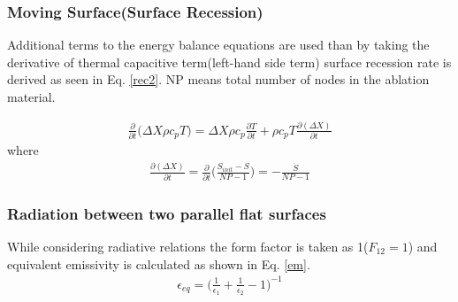 \documentclass[a4paper, 12pt]{article} %
\begin{document}
\subsubsection{Moving Surface(Surface Recession)}
Additional terms to the energy balance equations are used than by taking the derivative of thermal capacitive term(left-hand side term) surface recession rate is derived as seen in Eq. \ref{rec2}. NP means total number of nodes in the ablation material.

\begin{eqnarray} \label{rec1}
\frac{\partial}{\partial t} \biggr( \Delta X \rho c_pT \biggr) = \Delta X \rho c_p\frac{\partial T}{\partial t}+\rho c_pT\frac{\partial( \Delta X) }{\partial t}
\end{eqnarray} 
where
\begin{eqnarray} \label{rec2}
\frac{\partial( \Delta X) }{\partial t}=\frac{\partial}{\partial t}\biggr( \frac{S_{init}-S}{NP-1} \biggr)  = -\frac{\dot{S}}{NP-1}
\end{eqnarray}

\subsubsection{Radiation between two parallel flat surfaces}
While considering radiative relations the form factor is taken as 1($F_{12}=1$) and equivalent emissivity is calculated as shown in Eq. \ref{em}.
\begin{eqnarray} \label{em}
\epsilon _{eq}=\biggr( \frac{1}{\epsilon _1}+\frac{1}{\epsilon _2}-1\biggr)^{-1}
\end{eqnarray}
\end{document}
